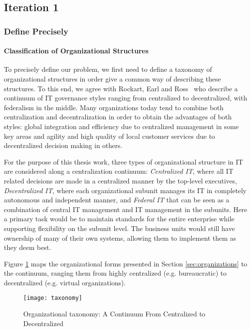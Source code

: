 \subsection{Iteration 1}

\subsubsection{Define Precisely}

\paragraph*{Classification of Organizational Structures}

To precisely define our problem, we first need to define a taxonomy of organizational structures in order give a common way of describing these structures. To this end, we agree with Rockart, Earl and Ross~\cite{Rockart1996} who describe a continuum of IT governance styles ranging from centralized to decentralized, with federalism in the middle. Many organizations today tend to combine both centralization and decentralization in order to obtain the advantages of both styles: global integration and efficiency due to centralized management in some key areas and agility and high quality of local customer services due to decentralized decision making in others. 

For the purpose of this thesis work, three types of organizational structure in IT are considered along a centralization continuum: \textit{Centralized IT}, where all IT related decisions are made in a centralized manner by the top-level executives, \textit{Decentralized IT}, where each organizational subunit manages its IT in completely autonomous and independent manner,  and \textit{Federal IT} that can be seen as a combination of central IT management and IT management in the subunits. Here a primary task  would be to maintain standards for the entire enterprise while supporting flexibility on the subunit level. The business units would still have ownership of many of their own systems, allowing them to implement them as they deem best. 

Figure \ref{fig:taxonomy} maps the organizational forms presented in Section \ref{sec:organizations} to the continuum, ranging them from highly centralized (e.g. bureaucratic) to decentralized (e.g. virtual organizations).

\begin{figure}
\centering
\texttt{[image: taxonomy]}
\caption{Organizational taxonomy: A Continuum From Centralized to Decentralized}
\label{fig:taxonomy}
\end{figure}

